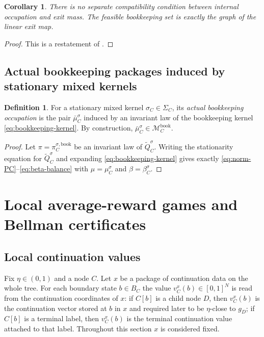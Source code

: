 \documentclass[12pt]{article}
\newtheorem{corollary}[theorem]{Corollary}
\theoremstyle{definition}
\newtheorem{definition}[theorem]{Definition}
\newcommand{\1}{\mathbf{1}}
\newcommand{\cM}{\mathcal{M}}
\begin{document}
\begin{corollary}
\label{cor:no-vp3}
There is no separate compatibility condition between internal occupation and exit
mass. The feasible bookkeeping set is exactly the graph of the linear exit map.
\end{corollary}

\begin{proof}
This is a restatement of .
\end{proof}

\subsection{Actual bookkeeping packages induced by stationary mixed kernels}

\begin{definition}
\label{def:actual-local-package}
For a stationary mixed kernel $\sigma_C\in\Sigma_C$, its \emph{actual bookkeeping
occupation} is the pair $\bar\mu_C^{\sigma}$ induced by an invariant law of the
bookkeeping kernel \eqref{eq:bookkeeping-kernel}. By construction,
$\bar\mu_C^{\sigma}\in \cM_C^{\mathrm{book}}$.
\end{definition}

\begin{proof}
Let $\pi=\pi_C^{\sigma,\mathrm{book}}$ be an invariant law of
$\widetilde Q_C^{\sigma}$. Writing the stationarity equation for
$\widetilde Q_C^{\sigma}$ and expanding \eqref{eq:bookkeeping-kernel} gives
exactly \eqref{eq:norm-PC}--\eqref{eq:beta-balance} with
$\mu=\mu_C^{\sigma}$ and $\beta=\beta_C^{\sigma}$.
\end{proof}

\section{Local average-reward games and Bellman certificates}
\label{sec:local}

\subsection{Local continuation values}

Fix $\eta\in(0,1)$ and a node $C$. Let $x$ be a package of continuation data on the
whole tree. For each boundary state $b\in B_C$ the value $v_C^x(b)\in[0,1]^N$ is
read from the continuation coordinates of $x$: if $C[b]$ is a child node $D$, then
$v_C^x(b)$ is the continuation vector stored at $b$ in $x$ and required later to
be $\eta$-close to $g_D$; if $C[b]$ is a terminal label, then $v_C^x(b)$ is the
terminal continuation value attached to that label. Throughout this section $x$ is
considered fixed.
\end{document}
